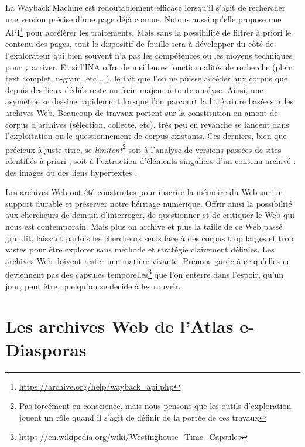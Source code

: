 \documentclass[symmetric,justified,marginals=raggedouter]{tufte-book}
\begin{document}
La Wayback Machine est redoutablement efficace lorsqu'il s'agit de rechercher une version précise d'une page déjà connue. Notons aussi qu'elle propose une API\footnote{\url{https://archive.org/help/wayback_api.php}} pour accélérer les traitements. Mais sans la possibilité de filtrer à priori le contenu des pages, tout le dispositif de fouille sera à développer du côté de l'explorateur qui bien souvent n'a pas les compétences ou les moyens techniques pour y arriver. Et si l'INA offre de meilleures fonctionnalités de recherche (plein text complet, n-gram, etc ...), le fait que l'on ne puisse accéder aux corpus que depuis des lieux dédiés reste un frein majeur à toute analyse. Ainsi, une asymétrie se dessine rapidement lorsque l'on parcourt la littérature basée sur les archives Web. Beaucoup de travaux portent sur la constitution en amont de corpus d'archives (sélection, collecte, etc), très peu en revanche se lancent dans l'exploitation ou le questionnement de corpus existants. Ces derniers, bien que précieux à juste titre, se \textit{limitent}\footnote{Pas forcément en conscience, mais nous pensons que les outils d'exploration jouent un rôle quand il s'agit de définir de la portée de ces travaux} soit à l'analyse de versions passées de sites identifiés à priori \citep{schafer_web_2016,gebeil_les_2016}, soit à l'extraction d'éléments singuliers d'un contenu archivé : des images \citep{ben-david_internet_2018} ou des liens hypertextes \citep{weltevrede_where_2012}.

Les archives Web ont été construites pour inscrire la mémoire du Web sur un support durable et préserver notre héritage numérique. Offrir ainsi la possibilité aux chercheurs de demain d'interroger, de questionner et de critiquer le Web qui nous est contemporain. Mais plus on archive et plus la taille de ce Web passé grandit, laissant parfois les chercheurs seuls face à des corpus trop larges et trop vastes pour être explorer sans méthode et stratégie clairement définies. Les archives Web doivent rester une matière vivante. Prenons garde à ce qu'elles ne deviennent pas des capsules temporelles\footnote{\url{https://en.wikipedia.org/wiki/Westinghouse\_Time\_Capsules}} que l'on enterre dans l'espoir, qu'un jour, peut être, quelqu'un se décide à les rouvrir. 

\section{Les archives Web de l'Atlas e-Diasporas}
\label{sec:3_edias}
\end{document}
